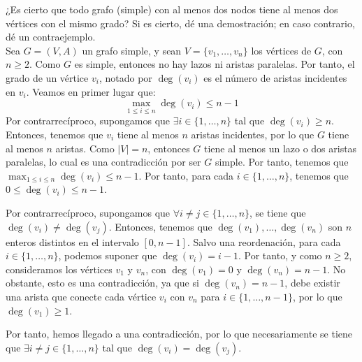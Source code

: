 \documentclass[12pt]{article}
\begin{document}
\begin{ejercicio}
    ¿Es cierto que todo grafo (simple) con al menos dos nodos
    tiene al menos dos vértices con el mismo grado? Si es cierto,
    dé una demostración; en caso contrario, dé un contraejemplo.\\

    Sea $G=(V,A)$ un grafo simple, y sean $V=\{v_1, \ldots, v_n\}$ los vértices de $G$, con $n\geq 2$.
    Como $G$ es simple, entonces no hay lazos ni aristas paralelas. Por tanto, el grado de un vértice $v_i$, notado por $\deg (v_i)$ es el número de aristas incidentes en $v_i$.
    Veamos en primer lugar que:
    \begin{equation*}
        \max_{1\leq i\leq n}\deg(v_i) \leq n-1
    \end{equation*}
    Por contrarrecíproco, supongamos que $\exists i\in \{1, \ldots, n\}$ tal que $\deg(v_i) \geq n$. Entonces, tenemos que $v_i$ tiene al menos $n$ aristas incidentes, por lo que $G$ tiene al menos $n$ aristas.
    Como $|V|=n$, entonces $G$ tiene al menos un lazo o dos aristas paralelas, lo cual es una contradicción por ser $G$ simple. Por tanto, tenemos que $\max_{1\leq i\leq n}\deg(v_i) \leq n-1$.
    Por tanto, para cada $i\in \{1, \ldots, n\}$, tenemos que $0\leq \deg(v_i)\leq n-1$.

    Por contrarrecíproco, supongamos que $\forall i\neq j\in \{1, \ldots, n\}$, se tiene que $\deg(v_i)\neq \deg(v_j)$.
    Entonces, tenemos que $\deg(v_1), \ldots, \deg(v_n)$ son $n$ enteros distintos en el intervalo $[0, n-1]$.
    Salvo una reordenación, para cada $i\in \{1, \ldots, n\}$, podemos suponer que $\deg(v_i) = i-1$.
    Por tanto, y como $n\geq 2$, consideramos los vértices $v_1$ y $v_n$, con $\deg(v_1) = 0$ y $\deg(v_n) = n-1$.
    No obstante, esto es una contradicción, ya que si $\deg(v_n)=n-1$, debe existir una arista que conecte cada vértice $v_i$ con $v_n$ para $i\in \{1, \ldots, n-1\}$, por lo que $\deg(v_1)\geq 1$.

    Por tanto, hemos llegado a una contradicción, por lo que necesariamente se tiene que $\exists i\neq j\in \{1, \ldots, n\}$ tal que $\deg(v_i) = \deg(v_j)$.

\end{ejercicio}

    
\end{document}
